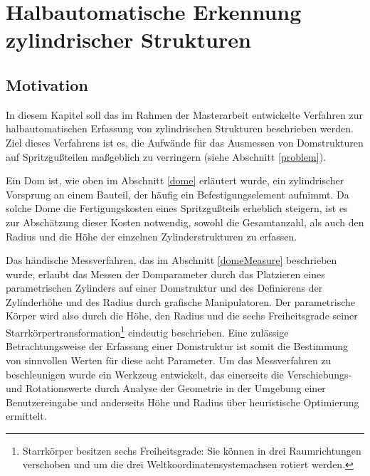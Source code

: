 \chapter{Halbautomatische Erkennung zylindrischer Strukturen}
\label{cha:psoDomes}
	
\section{Motivation}

In diesem Kapitel soll das im Rahmen der Masterarbeit entwickelte Verfahren zur halbautomatischen Erfassung 
von zylindrischen Strukturen beschrieben werden. Ziel dieses Verfahrens ist es, die Aufw\"ande f\"ur das Ausmessen von Domstrukturen auf Spritzgu{\ss}teilen ma{\ss}geblich zu verringern (siehe Abschnitt \ref{problem}). 

Ein Dom ist, wie oben im Abschnitt \ref{dome} erl\"autert wurde, ein zylindrischer Vorsprung an einem Bauteil, der h\"aufig ein Befestigungselement aufnimmt. Da solche Dome die Fertigungskosten eines Spritzgu{\ss}teils erheblich steigern, ist es zur Absch\"atzung dieser Kosten notwendig, sowohl die Gesamtanzahl, als auch den Radius und die H\"ohe der einzelnen Zylinderstrukturen zu erfassen.

Das h\"andische Messverfahren, das im Abschnitt \ref{domeMeasure} beschrieben wurde, erlaubt das Messen der Domparameter durch das Platzieren eines parametrischen Zylinders auf einer Domstruktur und des Definierens der Zylinderh\"ohe und des Radius durch grafische Manipulatoren. 
Der parametrische K\"orper wird also durch die H\"ohe, den Radius und die sechs Freiheitsgrade seiner Starrk\"orpertransformation\footnote{Starrkörper besitzen sechs Freiheitsgrade: Sie können in drei Raumrichtungen
verschoben und um die drei Weltkoordinatensystemachsen rotiert werden.} eindeutig beschrieben. Eine zul\"assige Betrachtungsweise der Erfassung einer Domstruktur ist somit die Bestimmung von sinnvollen Werten für diese acht Parameter. Um das Messverfahren zu beschleunigen wurde ein Werkzeug entwickelt, das einerseits die Verschiebungs- und
Rotationswerte durch Analyse der Geometrie in der Umgebung einer Benutzereingabe und anderseits H\"ohe und Radius 
über heuristische Optimierung ermittelt.

